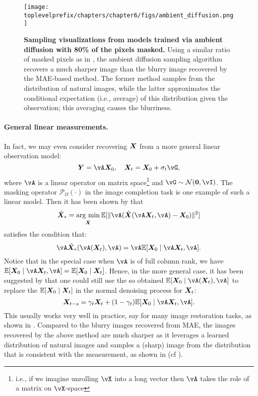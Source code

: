 \documentclass[../../book-main.tex]{subfiles}
\begin{document}
\begin{figure}
  \centering
  \texttt{[image: \\toplevelprefix/chapters/chapter6/figs/ambient\_diffusion.png]}
  \caption{\small \textbf{Sampling visualizations from models trained via ambient diffusion \cite{Daras-NIPS2023} with 80\% of the pixels masked.} Using a similar ratio of masked pixels as in , the ambient diffusion sampling algorithm recovers a much sharper image than the blurry image recovered by the MAE-based method. The former method samples from the distribution of natural images, while the latter approximates the conditional expectation (i.e., average) of this distribution given the observation; this averaging causes the blurriness.}
  \label{fig:ambient_diffusion}
\end{figure}

\paragraph{General linear measurements.} 
In fact, we may even consider recovering $\bm{X}$ from a more general linear observation model:
\begin{equation}
    \Y = \vA\X_0,  \quad \X_t = \X_0 + \sigma_t \vG,  
\end{equation}
where $\vA$ is a linear operator on matrix space\footnote{i.e., if we imagine unrolling \(\vX\) into a long vector then \(\vA\) takes the role of a matrix on \(\vX\)-space} and $\vG \sim \mathcal{N}(\boldsymbol{0}, \vI)$. The masking operator $\mathcal{P}_{\Omega}(\cdot)$ in the image completion task is one example of such a linear model. Then it has been shown by \cite{daras2023ambient} that 
\begin{equation}
    \hat{\X}_* = \argmin_{\hat{\X}} \mathbb{E}[\|\vA(\hat{\X}(\vA\X_t, \vA) - \X_0)\|^2]
\end{equation}
satisfies the condition that:
\begin{equation}
    \vA \hat{\X}_*(\vA(\X_t), \vA) = \vA \mathbb{E}[\X_0 \mid \vA \X_t, \vA].
\end{equation} Notice that in the special case when $\vA$ is of full column rank, we have $ \mathbb{E}[\X_0 \mid \vA\X_t, \vA] = \mathbb{E}[\X_0 \mid \X_t]$. Hence, in the more general case, it has been suggested by \cite{daras2023ambient} that one could still use the so obtained $\mathbb{E}[\X_0 \mid \vA(\X_t), \vA]$ to replace the $\mathbb{E}[\bm{X}_0 \mid \bm{X}_t]$ in the normal denoising process for $\bm{X}_t$:
\begin{equation}
    \X_{t-s} = \gamma_t \X_t + (1-\gamma_t) \mathbb{E}[\X_0 \mid \vA\X_t, \vA].
\end{equation}
This usually works very well in practice, say for many image restoration tasks, as shown in \cite{daras2023ambient}. Compared to the blurry images recovered from MAE, the images recovered by the above method are much sharper as it leverages a learned distribution of natural images and samples a (sharp) image from the distribution that is consistent with the measurement, as shown in  (cf ).
\end{document}
